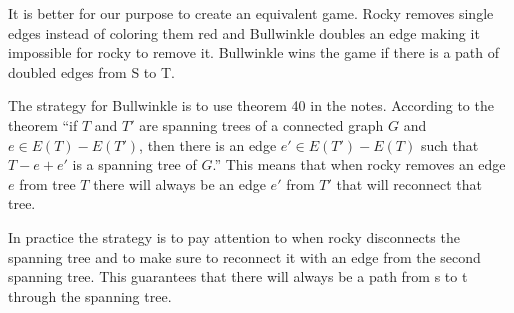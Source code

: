 \documentclass[answers]{exam}
\begin{document}
\begin{questions}
\begin{solution}
					It is better for our purpose to create an equivalent game. Rocky removes single edges instead of coloring them red and Bullwinkle doubles an edge making it impossible for rocky to remove it. Bullwinkle wins the game if there is a path of doubled edges from S to T. 

					The strategy for Bullwinkle is to use theorem 40 in the notes. According to the theorem ``if $T$ and $T'$ are spanning trees of a connected graph $G$ and $e \in E(T)-E(T')$, then there is an edge $e' \in E(T')-E(T)$ such that $T-e+e'$ is a spanning tree of $G$.'' This means that when rocky removes an edge $e$ from tree $T$ there will always be an edge $e'$ from $T'$ that will reconnect that tree. 

					In practice the strategy is to pay attention to when rocky disconnects the spanning tree and to make sure to reconnect it with an edge from the second spanning tree. This guarantees that there will always be a path from s to t through the spanning tree.
			\end{solution}
	\end{questions}
	
	
\end{document}
